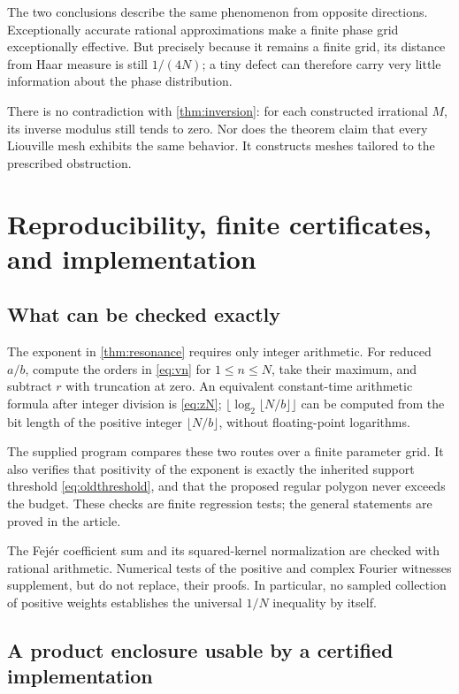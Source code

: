 \documentclass[11pt,a4paper]{article}
\numberwithin{equation}{section}
\theoremstyle{plain}
\theoremstyle{definition}
\theoremstyle{remark}
\begin{document}
The two conclusions describe the same phenomenon from opposite directions.
Exceptionally accurate rational approximations make a finite phase grid
exceptionally effective. But precisely because it remains a finite grid,
its distance from Haar measure is still $1/(4N)$; a tiny defect can therefore
carry very little information about the phase distribution.

There is no contradiction with \cref{thm:inversion}: for each constructed
irrational $M$, its inverse modulus still tends to zero. Nor does the theorem
claim that every Liouville mesh exhibits the same behavior. It constructs
meshes tailored to the prescribed obstruction.

\section{Reproducibility, finite certificates, and implementation}
\label{sec:checks}

\subsection{What can be checked exactly}

The exponent in \cref{thm:resonance} requires only integer arithmetic.
For reduced $a/b$, compute the orders in \eqref{eq:vn} for $1\le n\le N$,
take their maximum, and subtract $r$ with truncation at zero. An equivalent
constant-time arithmetic formula after integer division is
\eqref{eq:zN}; $\lfloor\log_2\lfloor N/b\rfloor\rfloor$ can be computed
from the bit length of the positive integer $\lfloor N/b\rfloor$, without
floating-point logarithms.

The supplied program compares these two routes over a finite parameter grid.
It also verifies that positivity of the exponent is exactly the inherited
support threshold \eqref{eq:oldthreshold}, and that the proposed regular
polygon never exceeds the budget. These checks are finite regression tests;
the general statements are proved in the article.

The Fej\'er coefficient sum and its squared-kernel normalization are checked
with rational arithmetic. Numerical tests of the positive and complex
Fourier witnesses supplement, but do not replace, their proofs. In
particular, no sampled collection of positive weights establishes the
universal $1/N$ inequality by itself.

\subsection{A product enclosure usable by a certified implementation}
\end{document}
